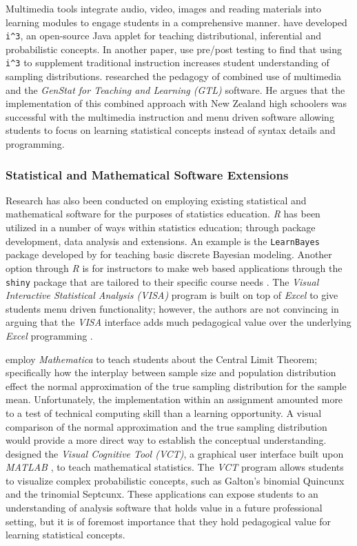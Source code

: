 \documentclass[11pt]{isuthesis}\usepackage[]{graphicx}\usepackage[]{color}
\begin{document}
Multimedia tools integrate audio, video, images and reading materials into learning modules to engage students in a comprehensive manner. \citet{McDanielGreen2012Paper1} have developed \texttt{i\string^3}, an open-source Java applet for teaching distributional, inferential and probabilistic concepts.  In another paper, \citet{McDanielGreen2012Paper2} use pre/post testing to find that using \texttt{i\string^3} to supplement traditional instruction increases student understanding of sampling distributions. \citet{Harraway2012} researched the pedagogy of combined use of multimedia and the \textit{GenStat for Teaching and Learning (GTL)} software. He argues that the implementation of this combined approach with New Zealand high schoolers was successful with the multimedia instruction and menu driven software allowing students to focus on learning statistical concepts instead of syntax details and programming.

\subsubsection{Statistical and Mathematical Software Extensions} 

Research has also been conducted on employing existing statistical and mathematical software for the purposes of statistics education. \textit{R} has been utilized in a number of ways within statistics education; through package development, data analysis and extensions. An example is the \texttt{LearnBayes} package \citep{LearnBayes} developed by \citet{Albert2009} for teaching basic discrete Bayesian modeling. Another option through \textit{R} is for instructors to make web based applications through the \texttt{shiny} package that are tailored to their specific course needs \citep{shiny}. The \textit{Visual Interactive Statistical Analysis (VISA)} program is built on top of \textit{Excel} \citep{Excel} to give students menu driven functionality; however, the authors are not convincing in arguing that the \textit{VISA} interface adds much pedagogical value over the underlying \textit{Excel} programming \citep{Shaltayev2010}. 

\citet{Hoff2012} employ \textit{Mathematica} \citep{Mathematica} to teach students about the  Central Limit Theorem; specifically how the interplay between sample size and population distribution effect the normal approximation of the true sampling distribution for the sample mean. Unfortunately, the implementation within an assignment amounted more to a test of technical computing skill than a learning opportunity. A visual comparison of the normal approximation and the true sampling distribution would provide a more direct way to establish the conceptual understanding.  \citet{Harlow2009} designed the \textit{Visual Cognitive Tool (VCT)}, a graphical user interface built upon \textit{MATLAB} \citep{MATLAB}, to teach mathematical statistics.  The \textit{VCT} program allows students to visualize complex probabilistic concepts, such as Galton's binomial Quincunx and the trinomial Septcunx. These applications can expose students to an understanding of analysis software that holds value in a future professional setting, but it is of foremost importance that they hold pedagogical value for learning statistical concepts.
\end{document}
